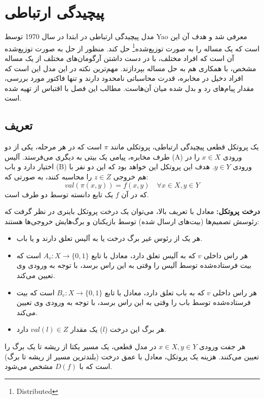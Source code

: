 \chapter{پیچیدگی ارتباطی}\label{chapter1}


\par
مدل پیچیدگی ارتباطی در ابتدا در سال 1970 توسط Yao معرفی شد و هدف آن این است که یک مساله‌ را به صورت توزیع‌شده\footnote{Distributed} حل کند. منظور از حل به صورت توزیع‌شده آن است که افراد مختلف، با در دست داشتن آرگومان‌های مختلف از یک مساله مشخص، با همکاری هم به حل مساله بپردازند. مهم‌ترین نکته در این مدل این است که افراد دخیل در مخابره، قدرت محاسباتی نامحدود دارند و تنها فاکتور مورد بررسی، مقدار پیام‌های رد و بدل شده میان آ‌ن‌هاست.
 مطالب این فصل با اقتباس از 
 \cite{ 
 		nissan09,
 		lee09,
 		tim15,
 		toni14,
 		sherstov18
 		}
 تهیه شده است.


\section{تعریف}

یک پروتکل قطعی پیچیدگی ارتباطی، پروتکلی مانند $\pi$ است که در هر مرحله، یکی از دو طرف مخابره، پیامی یک بیتی به دیگری می‌فرستد. آلیس (A) ورودی $x \in X$ را در اختیار دارد و باب (B) ورودی $y \in Y$. هدف این پروتکل این خواهد بود که این دو نفر با هم خروجی $z \in Z$ را محاسبه کنند، به صورتی که:
\[val(\pi(x, y)) = f(x, y) \quad \forall x \in X, y \in Y\]
که در آن $f$ یک تابع دانسته توسط دو طرف است.
\par

\textbf{  درخت پروتکل: }
معادل با تعریف بالا، می‌توان یک درخت پروتکل باینری در نظر گرفت که رئوسش تصمیم‌ها (بیت‌های ارسال شده) توسط بازیکنان و برگ‌هایش خروجی‌ها هستند:

\begin{itemize}
    \item هر یک از رئوس غیر برگ درخت یا به آلیس تعلق دارند و یا باب.
    \item هر راس داخلی $v$ که به آلیس تعلق دارد، معادل با تابع $A_v: X \rightarrow \{0,1\}$ است که بیت فرستاده‌شده توسط آلیس را وقتی به این راس برسد، با توجه به ورودی وی تعیین می‌کند.
    \item هر راس داخلی $v$ که به باب تعلق دارد، معادل با تابع $B_v: X \rightarrow \{0,1\}$ است که بیت فرستاده‌شده توسط باب را وقتی به این راس برسد، با توجه به ورودی وی تعیین می‌کند.
    \item هر برگ این درخت ($l$) یک مقدار $val(l) \in Z$ دارد.
\end{itemize}

هر جفت ورودی $x \in X, y \in Y$ در مدل قطعی، یک مسیر یکتا از ریشه تا یک برگ را تعیین می‌کنند. هزینه یک پروتکل، معادل با عمق درخت (بلندترین مسیر از ریشه تا برگ) است که با $D(f)$ مشخص می‌شود.

